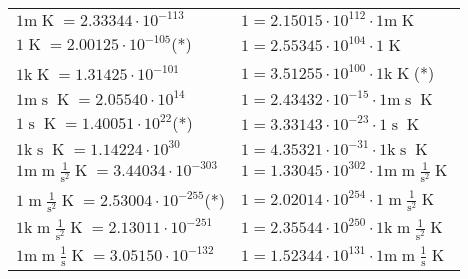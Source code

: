 \begin{center}
\begin{longtable}{l l}
{\color{gray}$1 \bm{\mathrm{ m}}{}{}{}{\operatorname{K}} = 2.33344\cdot10^{-113} $}   & {\color{gray}$ 1 = 2.15015\cdot10^{112} \cdot 1 \bm{\mathrm{ m}}{}{}{}{\operatorname{K}}$}  \\
{\color{black}$1 \bm{\mathrm{ }}{}{}{}{\operatorname{K}} = 2.00125\cdot10^{-105} $}\quad(*) & {\color{black}$ 1 = 2.55345\cdot10^{104} \cdot 1 \bm{\mathrm{ }}{}{}{}{\operatorname{K}}$}  \\
{\color{gray}$1 \bm{\mathrm{ k}}{}{}{}{\operatorname{K}} = 1.31425\cdot10^{-101} $}   & {\color{gray}$ 1 = 3.51255\cdot10^{100} \cdot 1 \bm{\mathrm{ k}}{}{}{}{\operatorname{K}}$}\quad(*)\\
{\color{gray}$1 \bm{\mathrm{ m}}{}{\operatorname{s}}{}{\operatorname{K}} = 2.05540\cdot10^{14} $}   & {\color{gray}$ 1 = 2.43432\cdot10^{-15} \cdot 1 \bm{\mathrm{ m}}{}{\operatorname{s}}{}{\operatorname{K}}$}  \\
{\color{black}$1 \bm{\mathrm{ }}{}{\operatorname{s}}{}{\operatorname{K}} = 1.40051\cdot10^{22} $}\quad(*) & {\color{black}$ 1 = 3.33143\cdot10^{-23} \cdot 1 \bm{\mathrm{ }}{}{\operatorname{s}}{}{\operatorname{K}}$}  \\
{\color{gray}$1 \bm{\mathrm{ k}}{}{\operatorname{s}}{}{\operatorname{K}} = 1.14224\cdot10^{30} $}   & {\color{gray}$ 1 = 4.35321\cdot10^{-31} \cdot 1 \bm{\mathrm{ k}}{}{\operatorname{s}}{}{\operatorname{K}}$}  \\
{\color{gray}$1 \bm{\mathrm{ m}}{\operatorname{m}}\frac1{\operatorname{s}^2}{}{\operatorname{K}} = 3.44034\cdot10^{-303} $}   & {\color{gray}$ 1 = 1.33045\cdot10^{302} \cdot 1 \bm{\mathrm{ m}}{\operatorname{m}}\frac1{\operatorname{s}^2}{}{\operatorname{K}}$}  \\
{\color{black}$1 \bm{\mathrm{ }}{\operatorname{m}}\frac1{\operatorname{s}^2}{}{\operatorname{K}} = 2.53004\cdot10^{-255} $}\quad(*) & {\color{black}$ 1 = 2.02014\cdot10^{254} \cdot 1 \bm{\mathrm{ }}{\operatorname{m}}\frac1{\operatorname{s}^2}{}{\operatorname{K}}$}  \\
{\color{gray}$1 \bm{\mathrm{ k}}{\operatorname{m}}\frac1{\operatorname{s}^2}{}{\operatorname{K}} = 2.13011\cdot10^{-251} $}   & {\color{gray}$ 1 = 2.35544\cdot10^{250} \cdot 1 \bm{\mathrm{ k}}{\operatorname{m}}\frac1{\operatorname{s}^2}{}{\operatorname{K}}$}  \\
{\color{gray}$1 \bm{\mathrm{ m}}{\operatorname{m}}\frac1{\operatorname{s}}{}{\operatorname{K}} = 3.05150\cdot10^{-132} $}   & {\color{gray}$ 1 = 1.52344\cdot10^{131} \cdot 1 \bm{\mathrm{ m}}{\operatorname{m}}\frac1{\operatorname{s}}{}{\operatorname{K}}$}  \\

\end{longtable}
\end{center}

